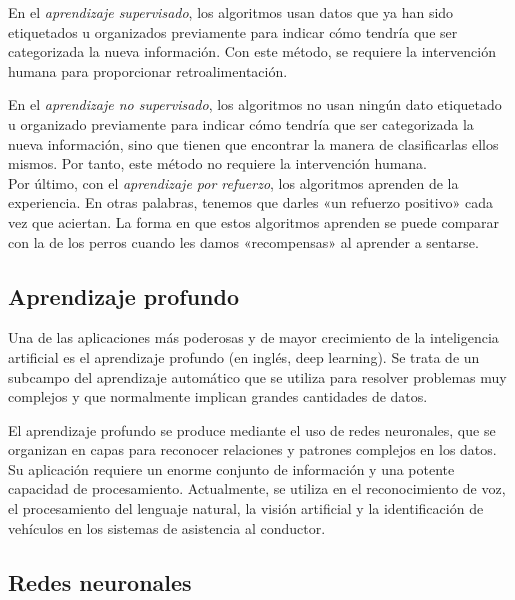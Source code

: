     
    En el \textit{aprendizaje supervisado}, los algoritmos usan datos que ya han sido etiquetados u organizados previamente para indicar cómo tendría que ser categorizada la nueva información. Con este método, se requiere la intervención humana para proporcionar retroalimentación.
    
    En el \textit{aprendizaje no supervisado}, los algoritmos no usan ningún dato etiquetado u organizado previamente para indicar cómo tendría que ser categorizada la nueva información, sino que tienen que encontrar la manera de clasificarlas ellos mismos. Por tanto, este método no requiere la intervención humana.\\
    \newline
    Por último, con el \textit{aprendizaje por refuerzo}, los algoritmos aprenden de la experiencia. En otras palabras, tenemos que darles «un refuerzo positivo» cada vez que aciertan. La forma en que estos algoritmos aprenden se puede comparar con la de los perros cuando les damos «recompensas» al aprender a sentarse.
    
    \subsection{Aprendizaje profundo}
    Una de las aplicaciones más poderosas y de mayor crecimiento de la inteligencia artificial es el aprendizaje profundo (en inglés, deep learning). Se trata de un subcampo del aprendizaje automático que se utiliza para resolver problemas muy complejos y que normalmente implican grandes cantidades de datos. 
    
    El aprendizaje profundo se produce mediante el uso de redes neuronales, que se organizan en capas para reconocer relaciones y patrones complejos en los datos. Su aplicación requiere un enorme conjunto de información y una potente capacidad de procesamiento. Actualmente, se utiliza en el reconocimiento de voz, el procesamiento del lenguaje natural, la visión artificial y la identificación de vehículos en los sistemas de asistencia al conductor.
    
    \subsection{Redes neuronales}
    
